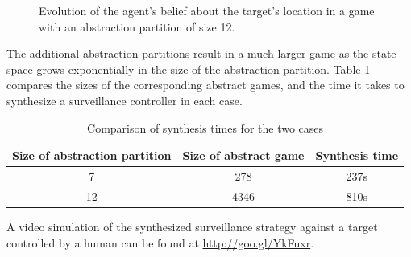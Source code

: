 \begin{figure}
\begin{minipage}{5.0cm}
{		}
		
	\end{minipage}
	
	
	\caption{Evolution of the agent's belief about the target's location in a game  with an abstraction partition of size 12.
	}
	\label{fig:case1fineexp}
	
\end{figure}


The additional abstraction partitions result in a much larger game as the state space grows exponentially in the size of the abstraction partition. Table \ref{tab:exp1} compares the sizes of the corresponding abstract games, and the time it takes to synthesize a surveillance controller in each case.


\begin{table}[h!]
	\centering
	\begin{tabular}{c|c|c}
	Size of abstraction partition & Size of abstract game & Synthesis time \\ \hline \hline
		7 & 278 & 237s \\ 
		12 & 4346 & 810s \\ 
	\end{tabular}\caption{Comparison of synthesis times for the two cases} \label{tab:exp1}
\end{table}


A video simulation of the synthesized surveillance strategy against a target controlled by a human can be found at \url{http://goo.gl/YkFuxr}.

